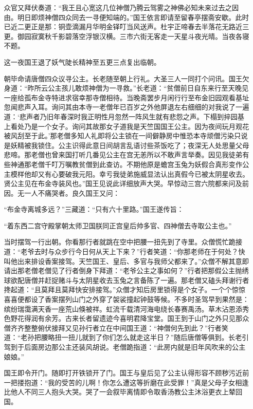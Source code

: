 \documentclass[12pt,UTF8]{ctexbook}
\begin{document}
{	众官又拜伏奏道：“我王且心宽这几位神僧乃腾云驾雾之神佛必知未来过去之因由。明日即烦神僧四众同去一寻便知端的。”国王依言即请至留春亭摆斋安歇。此时已近二更正是那：铜壶滴漏月华明金铎叮当风送声。杜宇正啼春去半落花无路近三更。御园寂寞秋千影碧落空浮银汉横。三市六街无客走一天星斗夜光晴。当夜各寝不题。
	
	这一夜国王退了妖气陡长精神至五更三点复出临朝。
	
	朝毕命请唐僧四众议寻公主。长老随至朝上行礼。大圣三人一同打个问讯。国王欠身道：“昨所云公主孩儿敢烦神僧为一寻救。”长老道：“贫僧前日自东来行至天晚见一座给孤布金寺特进求宿幸那寺僧相待。当晚斋罢步月闲行行至布金旧园观看基址忽闻悲声入耳。询问其由本寺一老僧年已百岁之外他屏退左右细细的对我说了一遍道：‘悲声者乃旧年春深时我正明性月忽然一阵风生就有悲怨之声。下榻到捽园基上看处乃是一个女子。询问其故那女子道我是天竺国国王公主。因为夜间玩月观花被风刮至于此。’那老僧多知人礼即将公主锁在一间僻静房中惟恐本寺顽僧污染只说是妖精被我锁住。公主识得此意日间胡言乱语讨些茶饭吃了；夜深无人处思量父母悲啼。那老僧也曾来国打听几番见公主在宫无恙所以不敢声言举奏。因见我徒弟有些神通那老僧千叮万嘱教贫僧到此查访。不期他原是蟾宫玉兔为妖假合真形变作公主模样他却又有心要破我元阳。幸亏我徒弟施威显法认出真假今已被太阴星收去。贤公主见在布金寺装风也。”国王见说此详细放声大哭。早惊动三宫六院都来问及前因。无一人不痛哭者。良久国王又问：
	
	“布金寺离城多远？”三藏道：“只有六十里路。”国王遂传旨：
	
	“着东西二宫守殿掌朝太师卫国朕同正宫皇后帅多官、四神僧去寺取公主也。”
	
	当时摆驾一行出朝。你看那行者就跳在空中把腰一扭先到了寺里。众僧慌忙跪接道：“老爷去时与众步行今日何从天上下来？”行者笑道：“你那老师在于何处？快叫他出来排设香案接驾。天竺国王、皇后、多官与我师父都来了。”众僧不解其意即请出那老僧老僧见了行者倒身下拜道：“老爷公主之事如何？”行者把那假公主抛绣球欲配唐僧并赶捉赌斗与太阴星收去玉兔之言备陈了一遍。那老僧又磕头拜谢行者搀起道：“且莫拜且莫拜快安排接驾。”众僧才知后房里锁得是个女子。一个个惊惊喜喜便都设了香案摆列山门之外穿了袈裟撞起钟鼓等候。不多时圣驾早到果然是：缤纷瑞霭满天香一座荒山倏被祥。虹流千载清河海电绕长春赛禹汤。草木沾恩添秀色野花得润有余芳。古来长者留遗迹今喜明君降宝堂。国王到于山门之外只见那众僧齐齐整整俯伏接拜又见孙行者立在中间国王道：“神僧何先到此？”行者笑道：“老孙把腰略扭一扭儿就到了你们怎么就走这半日？”随后唐僧等俱到。长老引驾到于后面房边那公主还装风胡说。老僧跪指道：“此房内就是旧年风吹来的公主娘娘。”
	
	国王即令开门。随即打开铁锁开了门。国王与皇后见了公主认得形容不顾秽污近前一把搂抱道：“我的受苦的儿啊！你怎么遭这等折磨在此受罪！”真是父母子女相逢比他人不同三人抱头大哭。哭了一会叙毕离情即令取香汤教公主沐浴更衣上辇回国。
	
}
\end{document}
